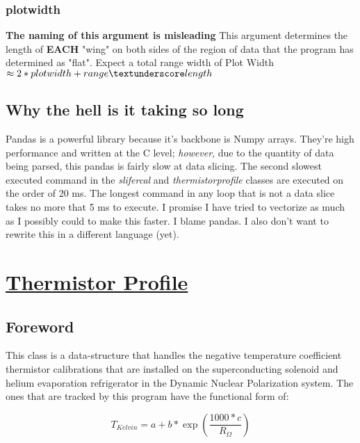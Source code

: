 \documentclass[12pt]{article}
\begin{document}
\subsubsection{plotwidth}
\textbf{The naming of this argument is misleading} This argument determines the length of \textbf{EACH} "wing" on both sides of the region of data that the program has determined as "flat". Expect a total range width of
Plot Width $\approx 2*plotwidth+range{\textunderscore}length$

\subsection{Why the hell is it taking so long}
Pandas is a powerful library because it's backbone is Numpy arrays. They're high performance and written at the C level; \textit{however}, due to the quantity of data being parsed, this pandas is fairly slow at data slicing. The second slowest executed command in the \textit{slifercal} and \textit{thermistor{\textunderscore}profile} classes are executed on the order of 20 ms. The longest command in any loop that is not a data slice takes no more that 5 ms to execute. I promise I have tried to vectorize as much as I possibly could to make this faster.  I blame pandas.  I also don't want to rewrite this in a different language (yet).
\section{\underline{Thermistor Profile}}
\subsection{Foreword}
This class is a data-structure that handles the negative temperature coefficient thermistor calibrations that are installed on the superconducting solenoid and helium evaporation refrigerator in the Dynamic Nuclear Polarization system. The ones that are tracked by this program have the functional form of:

\begin{equation}
T_{Kelvin} = a + b*\exp{(\frac{1000*c}{R_{\Omega}})}
\end{equation}
\end{document}

